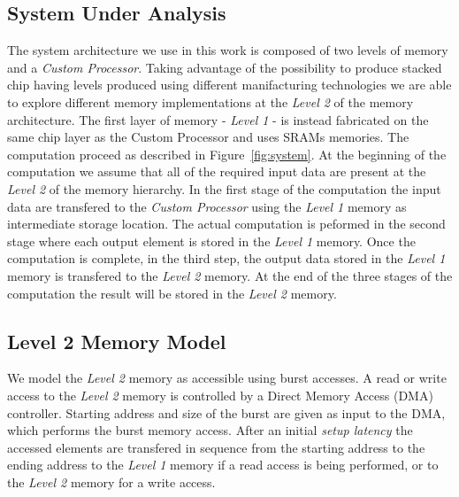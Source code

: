 \subsection{System Under Analysis}
\label{ssec:system_under_analysis}
The system architecture we use in this work is composed of two levels of memory and a \textit{Custom Processor}. Taking advantage of the possibility to produce stacked chip having levels produced using different manifacturing technologies we are able to explore different memory implementations at the \textit{Level 2} of the memory architecture. The first layer of memory - \textit{Level 1} - is instead fabricated on the same chip layer as the Custom Processor and uses SRAMs memories. The computation proceed as described in Figure~\ref{fig:system}. At the beginning of the computation we assume that all of the required input data are present at the \textit{Level 2} of the memory hierarchy. In the first stage of the computation the input data are transfered to the \textit{Custom Processor} using the \textit{Level 1} memory as intermediate storage location. The actual computation is peformed in the second stage where each output element is stored in the \textit{Level 1} memory. Once the computation is complete, in the third step, the output data stored in the \textit{Level 1} memory is transfered to the \textit{Level 2} memory. At the end of the three stages of the computation the result will be stored in the \textit{Level 2} memory.


\subsection{Level 2 Memory Model}
\label{ssec:layer2_model}
We model the \textit{Level 2} memory as accessible using burst accesses. 
A read or write access to the \textit{Level 2} memory is controlled by a Direct Memory Access (DMA) controller. Starting address and size of the burst are given as input to the DMA, which performs the burst memory access. After an initial \textit{setup latency} the accessed elements are transfered in sequence from the starting address to the ending address to the \textit{Level 1} memory if a read access is being performed, or to the \textit{Level 2} memory for a write access.

